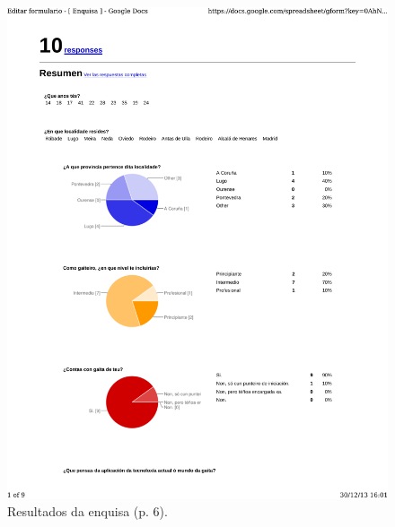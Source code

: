 \begin{figure}
 \centering
 \includegraphics[scale=0.7,page=6,keepaspectratio=true,clip,trim=0cm 0.5cm 0cm 0.5cm]{./imagenes/enquisa.pdf}
 \caption{Resultados da enquisa (p. 6).}
 \label{figura:ResultadosEnquisa6}
\end{figure}

